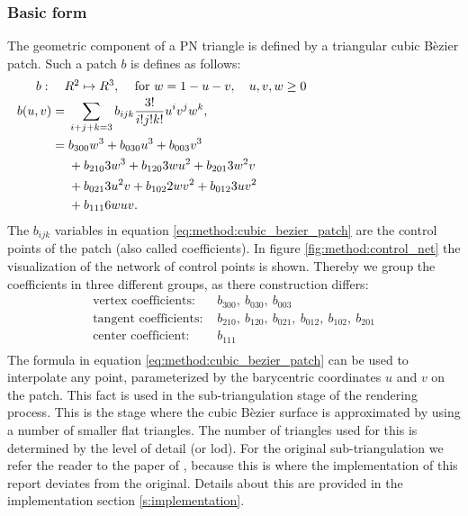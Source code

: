 \subsubsection{Basic form}
The geometric component of a PN triangle is defined by a triangular cubic B\`ezier patch. Such a patch $b$ is defines as follows:
%
\begin{align}
\noalign{$b: \quad R^2 \mapsto R^3,\quad$ for $w = 1 - u - v, \quad u, v, w \geq 0$}
\begin{split}\label{eq:method:cubic_bezier_patch}
    b(u,v) ={}& \sum_{i + j + k = 3} b_{ijk}\frac{3!}{i!j!k!} u^i v^j w^k,\\
      	   ={}& b_{300}w^3 + b_{030}u^3 + b_{003}v^3\\
      	    {}& + b_{210}3w^3 + b_{120}3wu^2 + b_{201}3w^2v\\
      	    {}& + b_{021}3u^2v + b_{102}2wv^2 + b_{012}3uv^2\\
      	    {}& + b_{111}6wuv.
\end{split}
\end{align}
%
The $b_{ijk}$ variables in equation \ref{eq:method:cubic_bezier_patch} are the control points of the patch (also called coefficients). In figure \ref{fig:method:control_net} the visualization of the network of control points is shown. Thereby we group the coefficients in three different groups, as there construction differs:
%
\begin{align*}
	\text{vertex coefficients: } {}&  b_{300},\ b_{030},\ b_{003} \\
	\text{tangent coefficients: } {}&  b_{210},\ b_{120},\ b_{021},\ b_{012},\ b_{102},\ b_{201}\\
	\text{center coefficient: }   {}&  b_{111}\\
\end{align*}
%
%
The formula in equation \ref{eq:method:cubic_bezier_patch} can be used to interpolate any point, parameterized by the barycentric coordinates $u$ and $v$ on the patch. This fact is used in the sub-triangulation stage of the rendering process. This is the stage where the cubic B\`ezier surface is approximated by using a number of smaller flat triangles. The number of triangles used for this is determined by the level of detail (or lod). For the original sub-triangulation we refer the reader to the paper of \citeauthor{vlachos2001curved}, because this is where the implementation of this report deviates from the original. Details about this are provided in the implementation section \ref{s:implementation}.
%
%

